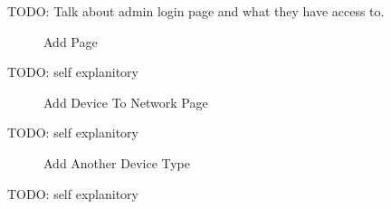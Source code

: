 \documentclass{report}
\begin{document}
\newpage
	TODO: Talk about admin login page and what they have access to.
\begin{figure}[H]
\caption{Add Page}
\end{figure}
\newpage
	TODO: self explanitory
\begin{figure}[H]
\caption{Add Device To Network Page}
\end{figure}
\newpage
	TODO: self explanitory

\begin{figure}[H]
\caption{Add Another Device Type}
\end{figure}
\newpage
	TODO: self explanitory
\end{document}
